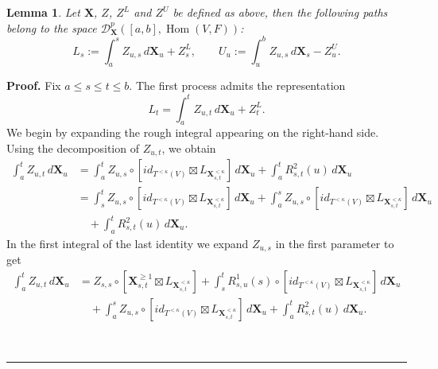 \documentclass{article}%
\newtheorem{lemma}[theorem]{Lemma}
\newenvironment{proof}[1][Proof]{\noindent\textbf{#1.} }{\ \rule{0.5em}{0.5em}}
\begin{document}
\begin{lemma}\label{proposition_L_U_controlled}
Let $\mathbf{X}$, $Z$, $Z^L$ and $Z^U$ be defined as above, then the following paths belong to the space $\mathcal{D}^p_{\mathbf{X}}([a,b], \operatorname{Hom}(V, F))$:
\[
L_s := \int_a^s Z_{u,s} \, d\mathbf{X}_u + Z^L_{s}, 
\qquad
U_u := \int_u^b Z_{u,s} \, d\mathbf{X}_s - Z^U_{u}.  
\]
\end{lemma}
\begin{proof}
Fix $a \le s \le t \le b$. The first process admits the representation
\begin{equation} \label{LT_expansion}
L_t = \int_a^t Z_{u,t}\, d\mathbf{X}_u + Z_t^L .
\end{equation}
We begin by expanding the rough integral appearing on the right-hand side.
Using the decomposition of $Z_{u,t}$, we obtain
\begin{align*}
\int_a^t Z_{u,t}\, d\mathbf{X}_u
&= \int_a^t Z_{u,s} \circ
\left[ id_{T^{<\kappa}(V)} \boxtimes L_{\mathbf{X}_{s,t}^{<\kappa}} \right]
\, d\mathbf{X}_u
+ \int_a^t R^2_{s,t}(u)\, d\mathbf{X}_u \\
&= \int_s^t Z_{u,s} \circ
\left[ id_{T^{<\kappa}(V)} \boxtimes L_{\mathbf{X}_{s,t}^{<\kappa}} \right]
\, d\mathbf{X}_u
+ \int_a^s Z_{u,s} \circ
\left[ id_{T^{<\kappa}(V)} \boxtimes L_{\mathbf{X}_{s,t}^{<\kappa}} \right]
\, d\mathbf{X}_u  \\
&\quad + \int_a^t R^2_{s,t}(u)\, d\mathbf{X}_u .
\end{align*}
In the first integral of the last identity we expand $Z_{u,s}$ in the first parameter to get
\begin{align*}
\int_a^t Z_{u,t}\, d\mathbf{X}_u
&= Z_{s,s} \circ
\left[\mathbf{X}^{\ge 1}_{s,t} \boxtimes L_{\mathbf{X}_{s,t}^{<\kappa}}\right]
+ \int_s^t R^1_{s,u}(s) \circ
\left[ id_{T^{<\kappa}(V)} \boxtimes L_{\mathbf{X}_{s,t}^{<\kappa}} \right]
\, d\mathbf{X}_u \\
&\quad + \int_a^s Z_{u,s} \circ
\left[id_{T^{<\kappa}(V)} \boxtimes  L_{\mathbf{X}_{s,t}^{<\kappa} } \right]
\, d\mathbf{X}_u
+ \int_a^t R^2_{s,t}(u)\, d\mathbf{X}_u .
\end{align*}


\end{proof}
\end{document}
